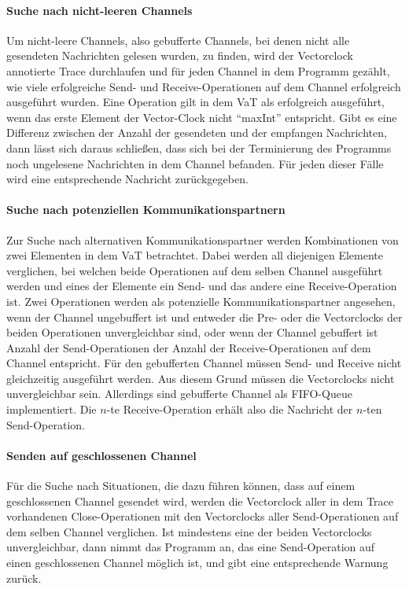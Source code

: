 \paragraph{Suche nach nicht-leeren Channels} 
Um nicht-leere Channels, also gebufferte Channels, bei denen nicht alle 
gesendeten Nachrichten gelesen wurden, zu finden, wird der Vectorclock annotierte
Trace durchlaufen und für jeden Channel in dem Programm gezählt, wie viele 
erfolgreiche Send- und Receive-Operationen auf dem Channel erfolgreich ausgeführt 
wurden. Eine Operation gilt in dem VaT als erfolgreich ausgeführt, wenn 
das erste Element der Vector-Clock nicht ``maxInt'' entspricht. Gibt es 
eine Differenz zwischen der Anzahl der gesendeten und der empfangen Nachrichten, 
dann lässt sich daraus schließen, dass sich bei der Terminierung des 
Programms noch ungelesene Nachrichten in dem Channel befanden.
Für jeden dieser Fälle wird eine entsprechende Nachricht zurückgegeben. 

\paragraph{Suche nach potenziellen Kommunikationspartnern}
Zur Suche nach alternativen Kommunikationspartner werden Kombinationen
von zwei Elementen in dem VaT betrachtet. Dabei werden all diejenigen 
Elemente verglichen, bei welchen beide Operationen auf dem selben Channel 
ausgeführt werden und eines der 
Elemente ein Send- und das andere eine Receive-Operation ist. Zwei Operationen
werden als potenzielle Kommunikationspartner angesehen, wenn der Channel 
ungebuffert ist und entweder die Pre- oder die Vectorclocks der beiden 
Operationen unvergleichbar sind, oder wenn der Channel gebuffert ist
Anzahl der Send-Operationen der Anzahl der Receive-Operationen auf dem Channel 
entspricht. Für den gebufferten Channel müssen Send- und Receive nicht 
gleichzeitig ausgeführt werden. Aus diesem Grund müssen die Vectorclocks 
nicht unvergleichbar sein. Allerdings sind gebufferte Channel als FIFO-Queue 
implementiert. Die $n$-te Receive-Operation erhält also die Nachricht der 
$n$-ten Send-Operation.

\paragraph{Senden auf geschlossenen Channel}
Für die Suche nach Situationen, die dazu führen können, dass auf einem 
geschlossenen Channel gesendet wird, werden die Vectorclock aller in dem 
Trace vorhandenen Close-Operationen mit den Vectorclocks aller Send-Operationen
auf dem selben Channel verglichen. Ist mindestens eine der beiden Vectorclocks 
unvergleichbar, dann nimmt das Programm an, das eine Send-Operation auf 
einen geschlossenen Channel möglich ist, und gibt eine entsprechende 
Warnung zurück.